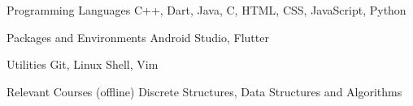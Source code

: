

\begin{cvskills}

  \cvskill
    {Programming Languages} %
    { C++, Dart, Java, C, HTML, CSS, JavaScript, Python} %

  \cvskill
    {Packages and Environments} %
    {Android Studio, Flutter} %
    

  \cvskill
    {Utilities} %
    {Git, Linux Shell, Vim} %


  \cvskill
    {Relevant Courses (offline)}
    {Discrete Structures, Data Structures and Algorithms} 
    
  
\end{cvskills}
